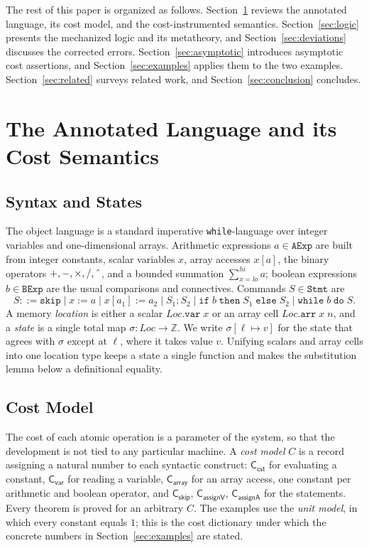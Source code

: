 \documentclass[runningheads]{llncs}
\newcommand{\State}{\sigma}
\newcommand{\Loc}{\mathit{Loc}}
\newcommand{\Int}{\mathbb{Z}}
\newcommand{\upd}[3]{#1[#2 \mapsto #3]}
\newcommand{\cst}[1]{\mathsf{C_{#1}}}
\newcommand{\code}[1]{\texttt{#1}}
\begin{document}
The rest of this paper is organized as follows.
Section~\ref{sec:background} reviews the annotated language, its cost model, and
the cost-instrumented semantics.
Section~\ref{sec:logic} presents the mechanized logic and its metatheory, and
Section~\ref{sec:deviations} discusses the corrected errors.
Section~\ref{sec:asymptotic} introduces asymptotic cost assertions, and
Section~\ref{sec:examples} applies them to the two examples.
Section~\ref{sec:related} surveys related work, and
Section~\ref{sec:conclusion} concludes.

\section{The Annotated Language and its Cost Semantics}\label{sec:background}

\subsection{Syntax and States}

The object language is a standard imperative \code{while}-language over integer
variables and one-dimensional arrays.
Arithmetic expressions $a \in \code{AExp}$ are built from integer constants,
scalar variables $x$, array accesses $x[a]$, the binary operators $+, -, \times,
/, \char`\^{}$, and a bounded summation $\sum_{x=lo}^{hi} a$; boolean
expressions
$b \in \code{BExp}$ are the usual comparisons and connectives.
Commands $S \in \code{Stmt}$ are
\[
S ::= \code{skip} \mid x := a \mid x[a_1] := a_2 \mid S_1; S_2 \mid
\code{if}\;b\;\code{then}\;S_1\;\code{else}\;S_2 \mid
\code{while}\;b\;\code{do}\;S.
\]
A memory \emph{location} is either a scalar $\Loc.\code{var}\;x$ or
an array cell
$\Loc.\code{arr}\;x\;n$, and a \emph{state} is a single total map
$\State : \Loc \to \Int$.
We write $\upd{\State}{\ell}{v}$ for the state that agrees with $\State$ except
at $\ell$, where it takes value $v$.
Unifying scalars and array cells into one location type keeps a state a single
function and makes the substitution lemma below a definitional equality.

\subsection{Cost Model}

The cost of each atomic operation is a parameter of the system, so that the
development is not tied to any particular machine.
A \emph{cost model} $C$ is a record assigning a natural number to each syntactic
construct: $\cst{cst}$ for evaluating a constant, $\cst{var}$ for reading a
variable, $\cst{array}$ for an array access, one constant per arithmetic and
boolean operator, and $\cst{skip}$, $\cst{assignV}$, $\cst{assignA}$ for the
statements.
Every theorem is proved for an arbitrary $C$.
The examples use the \emph{unit model}, in which every constant equals $1$; this
is the cost dictionary under which the concrete numbers in
Section~\ref{sec:examples} are stated.
\end{document}
